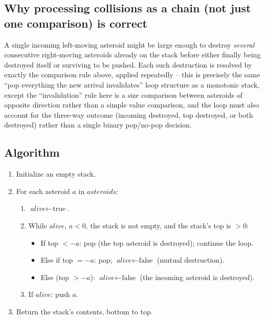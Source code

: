 \subsection*{Why processing collisions as a chain (not just one comparison) is correct}

A single incoming left-moving asteroid might be large enough to destroy
\emph{several} consecutive right-moving asteroids already on the stack
before either finally being destroyed itself or surviving to be pushed.
Each such destruction is resolved by exactly the comparison rule above,
applied repeatedly -- this is precisely the same ``pop everything the new
arrival invalidates'' loop structure as a monotonic stack, except the
``invalidation'' rule here is a size comparison between asteroids of
opposite direction rather than a simple value comparison, and the loop
must also account for the three-way outcome (incoming destroyed, top
destroyed, or both destroyed) rather than a single binary pop/no-pop
decision.

\subsection*{Algorithm}

\begin{enumerate}
  \item Initialize an empty stack.
  \item For each asteroid $a$ in $\textit{asteroids}$:
  \begin{enumerate}
    \item $\textit{alive} \gets \text{true}$.
    \item While $\textit{alive}$, $a < 0$, the stack is not empty, and
          the stack's top is $>0$:
    \begin{itemize}
      \item If top $< -a$: pop (the top asteroid is destroyed); continue
            the loop.
      \item Else if top $= -a$: pop; $\textit{alive} \gets \text{false}$
            (mutual destruction).
      \item Else (top $> -a$): $\textit{alive} \gets \text{false}$
            (the incoming asteroid is destroyed).
    \end{itemize}
    \item If $\textit{alive}$: push $a$.
  \end{enumerate}
  \item Return the stack's contents, bottom to top.
\end{enumerate}

